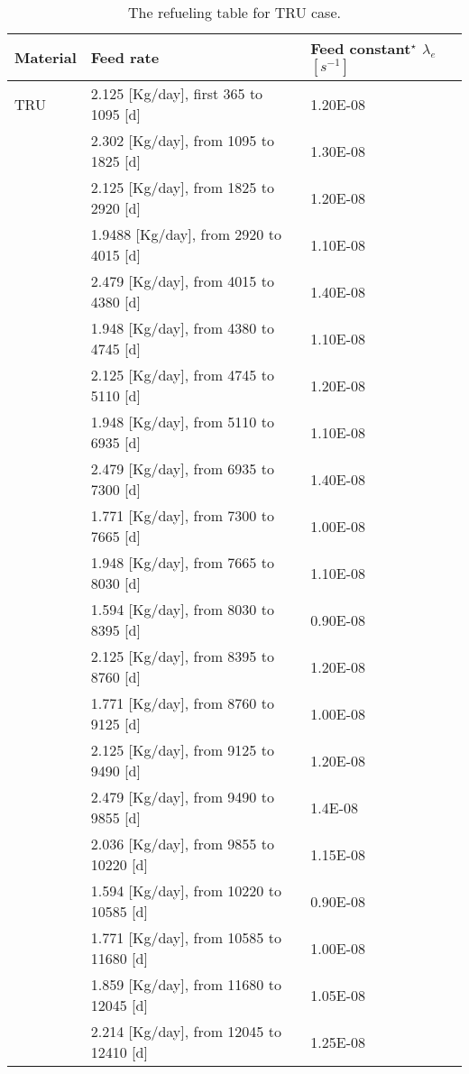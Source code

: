 \newpage
\begin{longtable}{|p{}|p{}|p{}|}
	\caption{The refueling table for TRU case.} 
	\vspace{-0.2in}
	\label{tab:table10}
	\endfirsthead
	\endhead
		\hline
		\textbf{Material} & \textbf{Feed rate} & \textbf{Feed 
		constant$^{\star}$} $\lambda_{e}$ $[s^{-1}]$ \\
		\hline
		TRU        &  2.125 [Kg/day], first 365 to 1095  [d] & 1.20E-08 \\
		&  2.302  [Kg/day], from 1095 to 1825 [d] & 		1.30E-08 \\
		&  2.125  [Kg/day], from 1825 to 2920 [d] & 		1.20E-08 \\
		&  1.9488 [Kg/day], from 2920 to 4015 [d]& 		1.10E-08	\\
		&  2.479 [Kg/day], from 4015 to 4380 [d] &		1.40E-08	\\
		&  1.948 [Kg/day], from 4380 to 4745 [d] &		1.10E-08	\\
		&  2.125   [Kg/day], from 4745 to 5110 [d] &	1.20E-08	\\
		&  1.948   [Kg/day], from 5110 to 6935 [d]&		1.10E-08		\\
		&  2.479  [Kg/day], from 6935 to 7300 [d]&		1.40E-08	 \\ 
		&  1.771   [Kg/day], from 7300 to 7665 [d]&		1.00E-08	 \\ 
		&  1.948   [Kg/day], from 7665 to 8030 [d]&		1.10E-08	 \\ 
		&  1.594   [Kg/day], from 8030 to 8395 [d]&		0.90E-08	 \\
		&  2.125   [Kg/day], from 8395 to 8760 [d]&		1.20E-08	 \\
		&  1.771  [Kg/day], from 8760 to 9125 [d]&		1.00E-08	 \\
		& 2.125  [Kg/day], from 9125 to 9490 [d]&		1.20E-08	 \\
		&  2.479  [Kg/day], from 9490 to 9855 [d]&		1.4E-08	 \\
		&   2.036 [Kg/day], from 9855 to 10220 [d]&		1.15E-08	 \\
		&  1.594 [Kg/day], from 10220 to 10585 [d]&		0.90E-08	 \\
		&   1.771  [Kg/day], from 10585 to 11680 [d]&		1.00E-08	 \\
		&  1.859   [Kg/day], from 11680 to 12045 [d]&		1.05E-08	 \\
		& 2.214    [Kg/day], from 12045 to 12410 [d]&		1.25E-08	 \\

\end{longtable}

